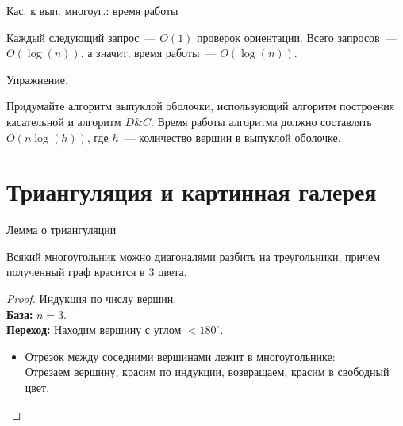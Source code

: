     \begin{frame}{Кас. к вып. многоуг.: время работы}

        Каждый следующий запрос~--- $O(1)$ проверок ориентации.
        Всего запросов~--- $O(\log(n))$, а значит, время работы~--- $O(\log(n))$.
        
        \vspace{5mm}
        
        \begin{block}{Упражнение.}

            Придумайте алгоритм выпуклой оболочки, использующий алгоритм построения касательной и алгоритм
            $D\&C$. Время работы алгоритма должно составлять $O(n\log(h))$, где $h$~--- количество вершин  в выпуклой оболочке.

        \end{block}

    \end{frame}

    \section{Триангуляция и картинная галерея}

    \begin{frame}{Лемма о триангуляции}

    \vspace{2mm}
    \begin{lm}[О триангуляции]\hypertarget{trianglemm}{}

        Всякий многоугольник можно диагоналями разбить на треугольники, причем полученный граф красится в 3 цвета.

    \end{lm}

    \begin{proof}\let\qed\relax
        Индукция по числу вершин.\\

        \textbf{База:} $n = 3$.\\
        \textbf{Переход:} Находим вершину с  углом $<180^{\circ}$.\\

        \begin{itemize}

            \item Отрезок между соседними  вершинами лежит в многоугольнике:\\
            Отрезаем вершину, красим по индукции, возвращаем, красим в свободный цвет.

        \end{itemize}

    \end{proof}

    \end{frame}

